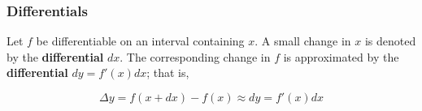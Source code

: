 \subsubsection{Differentials}
Let $f$ be differentiable on an interval containing $x$. A small change in $x$ is denoted by the \textbf{differential} $dx$. The corresponding change in $f$ is approximated by the \textbf{differential} $dy = f'(x) dx$; that is,

\begin{equation}
    \Delta y = f(x + dx) - f(x) \approx dy = f'(x) dx
\end{equation}
